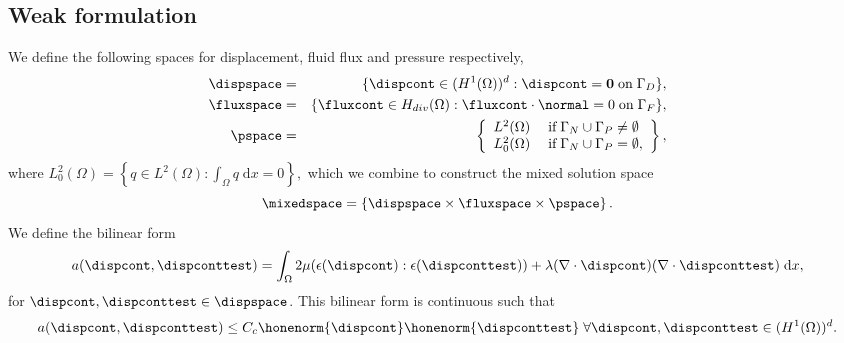 
\subsection{Weak formulation}
\label{sec:weak_formulation}

We define the following spaces for displacement, fluid flux and pressure respectively,
\begin{eqnarray*}
\dispspace &=& \lbrace \dispcont \in (H^{1} (\Omega))^d :\dispcont= {\bf 0} \;\mbox{on} \;\Gamma_{D} \rbrace, \\
\fluxspace &=& \lbrace \fluxcont \in H_{div}(\Omega):\fluxcont \cdot \normal = 0 \;\mbox{on} \;\Gamma_{F} \rbrace, \\
\pspace    &=& \left\lbrace
  \begin{array}{l l}
    L^{2}(\Omega)     &\; \text{if} \; \Gamma_{N} \cup \Gamma_{P} \neq \emptyset \\
    L^{2}_{0}(\Omega) &\; \text{if} \;\Gamma_{N} \cup \Gamma_{P}=\emptyset,
  \end{array} \right \rbrace,
\end{eqnarray*}
where
$L^{2}_{0}(\Omega) = \left\lbrace q \in L^{2}(\Omega) : \int_{\Omega} q\;\mbox{d}x=0\right\rbrace,$
which we combine to construct the mixed solution space
\begin{equation*}
\mixedspace = \left\lbrace \dispspace  \times \fluxspace  \times  \pspace \right\rbrace.
\end{equation*}
We define the bilinear form
\begin{equation*}
a(\dispcont,\dispconttest) = \int_{\Omega}2\mu (\epsilon(\dispcont):\epsilon(\dispconttest))
                           + \lambda (\nabla \cdot \dispcont)(\nabla \cdot \dispconttest) \; {\rm d}x,
\end{equation*}
for $\dispcont, \dispconttest \in \dispspace$. This bilinear form is continuous such that
\begin{equation}
\label{eqn:a_cont}
a(\dispcont,\dispconttest) \leq C_{c} \honenorm{ \dispcont }\honenorm {\dispconttest}
  \; \forall \dispcont,\dispconttest \in (H^{1}(\Omega))^d.
\end{equation}
